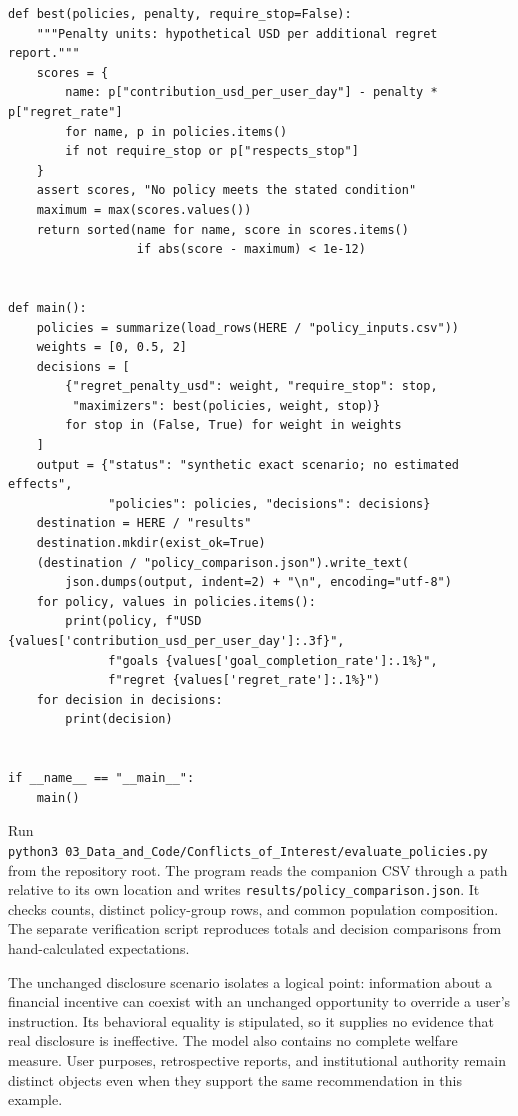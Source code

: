 \begin{Verbatim}[breaklines,breakanywhere,fontsize=\small]
def best(policies, penalty, require_stop=False):
    """Penalty units: hypothetical USD per additional regret report."""
    scores = {
        name: p["contribution_usd_per_user_day"] - penalty * p["regret_rate"]
        for name, p in policies.items()
        if not require_stop or p["respects_stop"]
    }
    assert scores, "No policy meets the stated condition"
    maximum = max(scores.values())
    return sorted(name for name, score in scores.items()
                  if abs(score - maximum) < 1e-12)


def main():
    policies = summarize(load_rows(HERE / "policy_inputs.csv"))
    weights = [0, 0.5, 2]
    decisions = [
        {"regret_penalty_usd": weight, "require_stop": stop,
         "maximizers": best(policies, weight, stop)}
        for stop in (False, True) for weight in weights
    ]
    output = {"status": "synthetic exact scenario; no estimated effects",
              "policies": policies, "decisions": decisions}
    destination = HERE / "results"
    destination.mkdir(exist_ok=True)
    (destination / "policy_comparison.json").write_text(
        json.dumps(output, indent=2) + "\n", encoding="utf-8")
    for policy, values in policies.items():
        print(policy, f"USD {values['contribution_usd_per_user_day']:.3f}",
              f"goals {values['goal_completion_rate']:.1%}",
              f"regret {values['regret_rate']:.1%}")
    for decision in decisions:
        print(decision)


if __name__ == "__main__":
    main()
\end{Verbatim}

Run
\texttt{python3\ 03\_Data\_and\_Code/Conflicts\_of\_Interest/evaluate\_policies.py}
from the repository root. The program reads the companion CSV through a
path relative to its own location and writes
\texttt{results/policy\_comparison.json}. It checks counts, distinct
policy-group rows, and common population composition. The separate
verification script reproduces totals and decision comparisons from
hand-calculated expectations.

The unchanged disclosure scenario isolates a logical point: information
about a financial incentive can coexist with an unchanged opportunity to
override a user's instruction. Its behavioral equality is stipulated, so
it supplies no evidence that real disclosure is ineffective. The model
also contains no complete welfare measure. User purposes, retrospective
reports, and institutional authority remain distinct objects even when
they support the same recommendation in this example.

